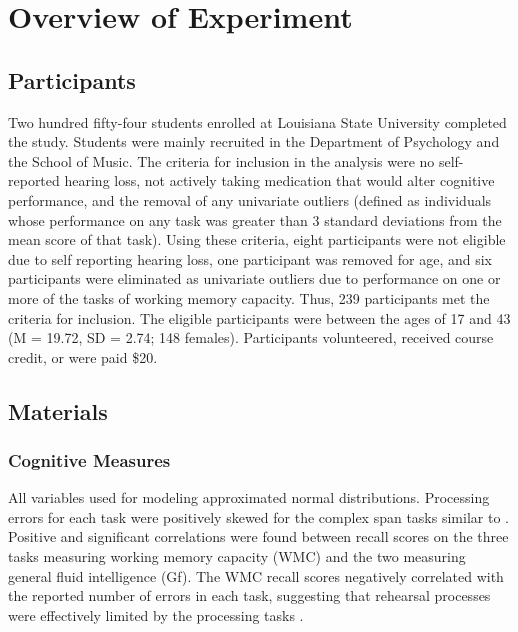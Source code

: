 \documentclass[]{book}
\begin{document}
\hypertarget{overview-of-experiment}{%
\section{Overview of Experiment}\label{overview-of-experiment}}

\hypertarget{participants}{%
\subsection{Participants}\label{participants}}

Two hundred fifty-four students enrolled at Louisiana State University completed the study.
Students were mainly recruited in the Department of Psychology and the School of Music.
The criteria for inclusion in the analysis were no self-reported hearing loss, not actively taking medication that would alter cognitive performance, and the removal of any univariate outliers (defined as individuals whose performance on any task was greater than 3 standard deviations from the mean score of that task).
Using these criteria, eight participants were not eligible due to self reporting hearing loss, one participant was removed for age, and six participants were eliminated as univariate outliers due to performance on one or more of the tasks of working memory capacity.
Thus, 239 participants met the criteria for inclusion.
The eligible participants were between the ages of 17 and 43 (M = 19.72, SD = 2.74; 148 females).
Participants volunteered, received course credit, or were paid \$20.

\hypertarget{materials}{%
\subsection{Materials}\label{materials}}

\hypertarget{cognitive-measures}{%
\subsubsection{Cognitive Measures}\label{cognitive-measures}}

All variables used for modeling approximated normal distributions.
Processing errors for each task were positively skewed for the complex span tasks similar to \citet{unsworthComplexWorkingMemory2009}.
Positive and significant correlations were found between recall scores on the three tasks measuring working memory capacity (WMC) and the two measuring general fluid intelligence (Gf).
The WMC recall scores negatively correlated with the reported number of errors in each task, suggesting that rehearsal processes were effectively limited by the processing tasks \citep{unsworthComplexWorkingMemory2009}.
\end{document}
